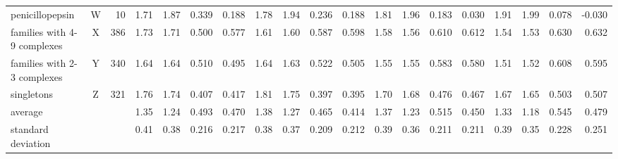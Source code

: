 \documentclass[linenumbers]{bmcart}
\begin{document}
\begin{backmatter}
\begin{sidewaystable}[ht]
\begin{tabular}{lcrrrrrrrrrrrrrrrrr}
penicillopepsin                & W &  10 & 1.71 & 1.87 & 0.339 & 0.188 & 1.78 & 1.94 & 0.236 & 0.188 & 1.81 & 1.96 & 0.183 & 0.030 & 1.91 & 1.99 & 0.078 &-0.030\\
families with 4-9 complexes    & X & 386 & 1.73 & 1.71 & 0.500 & 0.577 & 1.61 & 1.60 & 0.587 & 0.598 & 1.58 & 1.56 & 0.610 & 0.612 & 1.54 & 1.53 & 0.630 & 0.632\\
families with 2-3 complexes    & Y & 340 & 1.64 & 1.64 & 0.510 & 0.495 & 1.64 & 1.63 & 0.522 & 0.505 & 1.55 & 1.55 & 0.583 & 0.580 & 1.51 & 1.52 & 0.608 & 0.595\\
singletons                     & Z & 321 & 1.76 & 1.74 & 0.407 & 0.417 & 1.81 & 1.75 & 0.397 & 0.395 & 1.70 & 1.68 & 0.476 & 0.467 & 1.67 & 1.65 & 0.503 & 0.507\\
average                        &   &     & 1.35 & 1.24 & 0.493 & 0.470 & 1.38 & 1.27 & 0.465 & 0.414 & 1.37 & 1.23 & 0.515 & 0.450 & 1.33 & 1.18 & 0.545 & 0.479\\
standard deviation             &   &     & 0.41 & 0.38 & 0.216 & 0.217 & 0.38 & 0.37 & 0.209 & 0.212 & 0.39 & 0.36 & 0.211 & 0.211 & 0.39 & 0.35 & 0.228 & 0.251\\
\hline
\end{tabular}
\end{sidewaystable}


\end{backmatter}
\end{document}
